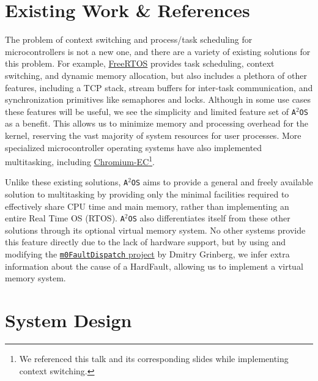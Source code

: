 \documentclass[12pt]{article}
\newcommand{\os}{\texttt{A$^2$OS} }
\begin{document}
\section{Existing Work \& References}

The problem of context switching and process/task scheduling for
microcontrollers is not a new one, and there are a variety of existing solutions
for this problem. For example,
\href{https://www.freertos.org/Documentation/02-Kernel/02-Kernel-features/01-Tasks-and-co-routines/00-Tasks-and-co-routines#characteristics-of-a-task}{FreeRTOS}
provides task scheduling, context switching, and dynamic memory allocation, but
also includes a plethora of other features, including a TCP stack, stream
buffers for inter-task communication, and synchronization primitives like
semaphores and locks. Although in some use cases these features will be useful,
we see the simplicity and limited feature set of \os as a benefit. This allows
us to minimize memory and processing overhead for the kernel, reserving the vast
majority of system resources for user processes. More specialized
microcontroller operating systems have also implemented multitasking, including
\href{https://www.youtube.com/watch?v=yHqaspeGJRw}{Chromium-EC}\footnote{We
referenced this talk and its corresponding slides while implementing context
switching.}.

Unlike these existing solutions, \os aims to provide a general and freely
available solution to multitasking by providing only the minimal facilities
required to effectively share CPU time and main memory, rather than implementing
an entire Real Time OS (RTOS). \os also differentiates itself from these other
solutions through its optional virtual memory system. No other systems provide
this feature directly due to the lack of hardware support, but by using and 
modifying the
\href{https://dmitry.gr/?r=05.Projects&proj=27.%20m0FaultDispatch}{\texttt{m0FaultDispatch} project}
by Dmitry Grinberg, we infer extra information about the cause of a
HardFault, allowing us to implement a virtual memory system.


\section{System Design}
\end{document}
